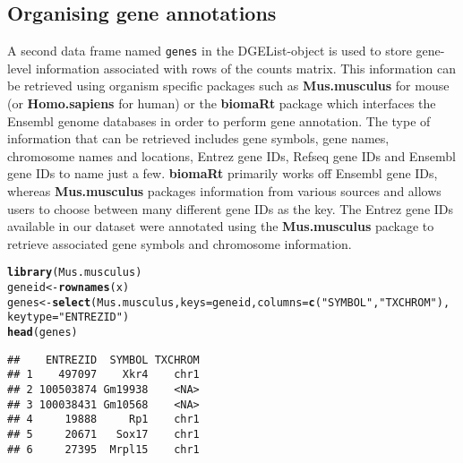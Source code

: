 \documentclass[10pt,a4paper]{extarticle}\usepackage[]{graphicx}\usepackage[]{color}
\makeatletter
\newcommand{\hlstr}[1]{\textcolor[rgb]{0.192,0.494,0.8}{#1}}%
\newcommand{\hlstd}[1]{\textcolor[rgb]{0.345,0.345,0.345}{#1}}%
\newcommand{\hlkwb}[1]{\textcolor[rgb]{0.69,0.353,0.396}{#1}}%
\newcommand{\hlkwc}[1]{\textcolor[rgb]{0.333,0.667,0.333}{#1}}%
\newcommand{\hlkwd}[1]{\textcolor[rgb]{0.737,0.353,0.396}{\textbf{#1}}}%
\newenvironment{kframe}{%
 \def\at@end@of@kframe{}%
 \ifinner\ifhmode%
  \def\at@end@of@kframe{\end{minipage}}%
  \begin{minipage}{\columnwidth}%
 \fi\fi%
 \def\FrameCommand##1{\hskip\@totalleftmargin \hskip-\fboxsep
 \colorbox{shadecolor}{##1}\hskip-\fboxsep
     \hskip-\linewidth \hskip-\@totalleftmargin \hskip\columnwidth}%
 \MakeFramed {\advance\hsize-\width
   \@totalleftmargin\z@ \linewidth\hsize
   \@setminipage}}%
 {\par\unskip\endMakeFramed%
 \at@end@of@kframe}
\newenvironment{knitrout}{}{} %
\makeatother
\begin{document}
\subsection*{Organising gene annotations}

A second data frame named \texttt{genes} in the DGEList-object is used to store gene-level information associated with rows of the counts matrix.
This information can be retrieved using organism specific packages such as \textbf{Mus.musculus} \cite{orgMm:2016} for mouse (or \textbf{Homo.sapiens} \cite{orgHs:2016} for human) or the \textbf{biomaRt} package \cite{Durinck:Bioinf:2005,Durinck:NatureProtocols:2009} which interfaces the Ensembl genome databases in order to perform gene annotation.
The type of information that can be retrieved includes gene symbols, gene names, chromosome names and locations, Entrez gene IDs, Refseq gene IDs and Ensembl gene IDs to name just a few. \textbf{biomaRt} primarily works off Ensembl gene IDs, whereas \textbf{Mus.musculus} packages information from various sources and allows users to choose between many different gene IDs as the key. 
The Entrez gene IDs available in our dataset were annotated using the \textbf{Mus.musculus} package to retrieve associated gene symbols and chromosome information. 
\begin{knitrout}
\color{fgcolor}\begin{kframe}
\begin{alltt}
\hlkwd{library}\hlstd{(Mus.musculus)}
\hlstd{geneid} \hlkwb{<-} \hlkwd{rownames}\hlstd{(x)}
\hlstd{genes} \hlkwb{<-} \hlkwd{select}\hlstd{(Mus.musculus,} \hlkwc{keys}\hlstd{=geneid,} \hlkwc{columns}\hlstd{=}\hlkwd{c}\hlstd{(}\hlstr{"SYMBOL"}\hlstd{,} \hlstr{"TXCHROM"}\hlstd{),}
                \hlkwc{keytype}\hlstd{=}\hlstr{"ENTREZID"}\hlstd{)}
\hlkwd{head}\hlstd{(genes)}
\end{alltt}
\begin{verbatim}
##    ENTREZID  SYMBOL TXCHROM
## 1    497097    Xkr4    chr1
## 2 100503874 Gm19938    <NA>
## 3 100038431 Gm10568    <NA>
## 4     19888     Rp1    chr1
## 5     20671   Sox17    chr1
## 6     27395  Mrpl15    chr1
\end{verbatim}
\end{kframe}
\end{knitrout}
\end{document}
